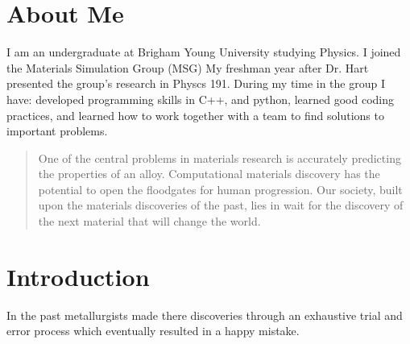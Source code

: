 \documentclass[a0,portrait]{a0poster}
\begin{document}
\begin{multicols}{2} %


\color{DarkSlateGray} %

\section*{About Me}
I am an undergraduate at Brigham Young University studying Physics. I joined the Materials Simulation Group (MSG) My freshman year after Dr. Hart presented the group's research in Physcs 191. During my time in the group I have: developed programming skills in C++, and python, learned good coding practices, and learned how to work together with a team to find solutions to important problems.  

\color{Navy} %

\begin{abstract}
One of the central problems in materials research is accurately predicting the properties of an alloy. Computational materials discovery has the potential to open the floodgates for human progression. Our society, built upon the materials discoveries of the past, lies in wait for the discovery of the next material that will change the world. 
\end{abstract}

\color{SaddleBrown} %

\section*{Introduction}
In the past metallurgists made there discoveries through an exhaustive trial and error process which eventually resulted in a happy mistake. 


\end{multicols}
\end{document}

